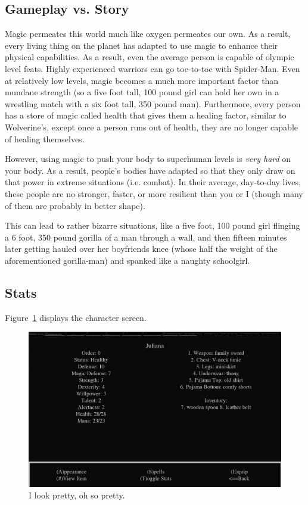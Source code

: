 \documentclass{report}
\begin{document}
\subsection{Gameplay vs. Story}
Magic permeates this world much like oxygen permeates our own. As a result, every living thing on the planet has adapted to use magic to enhance their physical capabilities. As a result, even the 
average person is capable of olympic level feats. Highly experienced warriors can go toe-to-toe with Spider-Man. Even at relatively low levels, magic becomes a much more important factor
than mundane strength (so a five foot tall, 100 pound girl can hold her own in a wrestling match with a six foot tall, 350 pound man). Furthermore, every person has a store of magic called health that 
gives them a healing factor, similar to Wolverine's, except once a person runs out of health, they are no longer capable of healing themselves.

However, using magic to push your body to superhuman levels is \emph{very hard} on your body. As a result, people's bodies have adapted so that they only draw on that power in extreme situations 
(i.e. combat). In their average, day-to-day lives, these people are no stronger, faster, or more resilient than you or I (though many of them are probably in better shape). 

This can lead to rather bizarre situations, like a five foot, 100 pound girl flinging a 6 foot, 350 pound gorilla of a man through a wall, and then fifteen minutes later getting hauled over her 
boyfriends knee (whose half the weight of the aforementioned gorilla-man) and spanked like a naughty schoolgirl.

\subsection{Stats}
Figure~\ref{fig_char_screen} displays the character screen.

\begin{figure}[h!]
    \includegraphics[width=\textwidth]{character_sheet}
    \caption{I look pretty, oh so pretty.}
    \label{fig_char_screen}
\end{figure}
\end{document}
